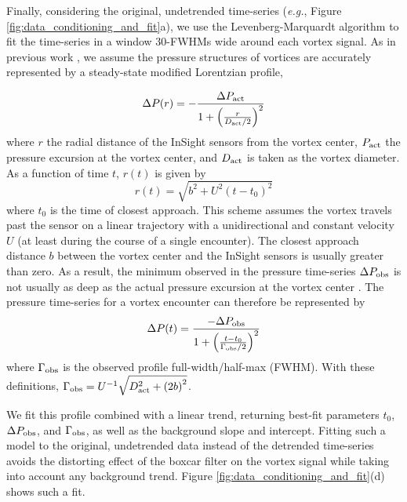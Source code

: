 \documentclass[linenumbers,trackchanges]{aastex63}
\begin{document}
Finally, considering the original, undetrended time-series (\emph{e.g.}, Figure \ref{fig:data_conditioning_and_fit}a), we use the Levenberg-Marquardt algorithm \citep[\emph{cf.}][]{Press2007} to fit the time-series in a window 30-FWHMs wide around each vortex signal. As in previous work \citep[\emph{e.g.},][]{2016JGRE..121.1514K}, we assume the pressure structures of vortices are accurately represented by a steady-state modified Lorentzian profile,

\begin{equation}
    \Delta P(r) = -\frac{\Delta P_{\rm act}}{1 + \left( \frac{r}{D_{\rm act}/2} \right)^2}\label{eqn:radial_lorentzian_profile}
\end{equation}
where $r$ the radial distance of the InSight sensors from the vortex center, $P_{\rm act}$ the pressure excursion at the vortex center, and $D_{\rm act}$ is taken as the vortex diameter. As a function of time $t$, $r(t)$ is given by
\begin{equation}
    r(t) = \sqrt{b^2 + U^2 \left( t - t_0 \right)^2}\label{eqn:radial_distance}
\end{equation}
where $t_0$ is the time of closest approach. This scheme assumes the vortex travels past the sensor on a linear trajectory with a unidirectional and constant velocity $U$ (at least during the course of a single encounter). The closest approach distance $b$ between the vortex center and the InSight sensors is usually greater than zero. As a result, the minimum observed in the pressure time-series $\Delta P_{\rm obs}$ is not usually as deep as the actual pressure excursion at the vortex center \citep{2018Icar..299..166J, 2019Icar..317..209K}. The pressure time-series for a vortex encounter can therefore be represented by 
\begin{equation}
    \Delta P(t) = \frac{-\Delta P_{\rm obs}}{1 + \left( \frac{ t - t_0 }{\Gamma_{\rm obs}/2} \right)^2}\label{eqn:Lorentzian_profile}
\end{equation}
where $\Gamma_{\rm obs}$ is the observed profile full-width/half-max (FWHM). With these definitions, $\Gamma_{\rm obs} = U^{-1} \sqrt{D_{\rm act}^2 + \left( 2 b \right)^2}$. 

We fit this profile combined with a linear trend, returning best-fit parameters $t_0$, $\Delta P_{\rm obs}$, and $\Gamma_{\rm obs}$, as well as the background slope and intercept. Fitting such a model to the original, undetrended data instead of the detrended time-series avoids the distorting effect of the boxcar filter on the vortex signal while taking into account any background trend. Figure \ref{fig:data_conditioning_and_fit}(d) shows such a fit.
\end{document}
